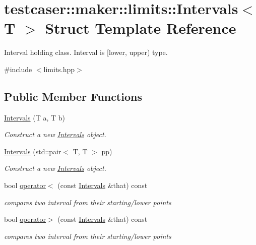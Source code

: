 \hypertarget{structtestcaser_1_1maker_1_1limits_1_1Intervals}{}\section{testcaser\+:\+:maker\+:\+:limits\+:\+:Intervals$<$ T $>$ Struct Template Reference}
\label{structtestcaser_1_1maker_1_1limits_1_1Intervals}


Interval holding class. Interval is \mbox{[}lower, upper) type.  




{\ttfamily \#include $<$limits.\+hpp$>$}

\subsection*{Public Member Functions}
\begin{DoxyCompactItemize}
\item 
\mbox{\hyperlink{structtestcaser_1_1maker_1_1limits_1_1Intervals_a69fe886908002aa20f41ed886fc213ef}{Intervals}} (T a, T b)
\begin{DoxyCompactList}\small\item\em Construct a new \mbox{\hyperlink{structtestcaser_1_1maker_1_1limits_1_1Intervals}{Intervals}} object. \end{DoxyCompactList}\item 
\mbox{\hyperlink{structtestcaser_1_1maker_1_1limits_1_1Intervals_ad899dc031cbffd5247b9b39e23577a52}{Intervals}} (std\+::pair$<$ T, T $>$ pp)
\begin{DoxyCompactList}\small\item\em Construct a new \mbox{\hyperlink{structtestcaser_1_1maker_1_1limits_1_1Intervals}{Intervals}} object. \end{DoxyCompactList}\item 
bool \mbox{\hyperlink{structtestcaser_1_1maker_1_1limits_1_1Intervals_a68c68c86d5074b2853d0f8582381fc7a}{operator$<$}} (const \mbox{\hyperlink{structtestcaser_1_1maker_1_1limits_1_1Intervals}{Intervals}} \&that) const
\begin{DoxyCompactList}\small\item\em compares two interval from their starting/lower points \end{DoxyCompactList}\item 
bool \mbox{\hyperlink{structtestcaser_1_1maker_1_1limits_1_1Intervals_af5204b4a6f57b16d6719a16554321b4b}{operator$>$}} (const \mbox{\hyperlink{structtestcaser_1_1maker_1_1limits_1_1Intervals}{Intervals}} \&that) const
\begin{DoxyCompactList}\small\item\em compares two interval from their starting/lower points \end{DoxyCompactList}\end{DoxyCompactItemize}
